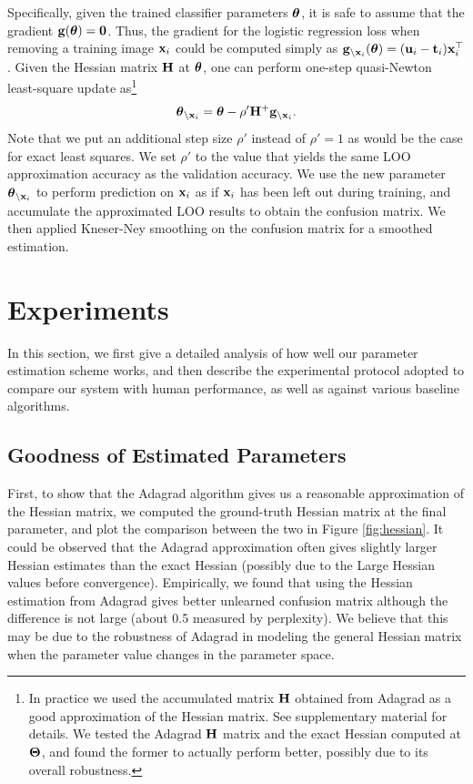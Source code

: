 Specifically, given the trained classifier parameters $\boldsymbol{\theta}$, it is safe to assume that the gradient $\mathbf{g}(\boldsymbol{\theta}) = \mathbf{0}$. Thus, the gradient for the logistic regression loss when removing a training image $\mathbf{x}_i$ could be computed simply as $\mathbf{g}_{\backslash\mathbf{x}_i}(\boldsymbol{\theta}) = (\mathbf{u}_i - \mathbf{t}_i) \mathbf{x}_i^\top$. Given the Hessian matrix $\mathbf{H}$ at $\boldsymbol{\theta}$, one can perform one-step quasi-Newton least-square update as\footnote{In practice we used the accumulated matrix $\mathbf{H}$ obtained from Adagrad \cite{duchi2010adaptive} as a good approximation of the Hessian matrix. See supplementary material for details. We tested the Adagrad $\mathbf{H}$ matrix and the exact Hessian computed at $\boldsymbol{\Theta}$, and found the former to actually perform better, possibly due to its overall robustness.}
\begin{equation}
    \boldsymbol{\theta}_{\backslash\mathbf{x}_i} = \boldsymbol{\theta} - \rho'\mathbf{H}^{+}\mathbf{g}_{\backslash\mathbf{x}_i}.
\end{equation}
Note that we put an additional step size $\rho'$ instead of $\rho'=1$ as would be the case for exact least squares. We set $\rho'$ to the value that yields the same LOO approximation accuracy as the validation accuracy. We use the new parameter $\boldsymbol{\theta}_{\backslash\mathbf{x}_i}$ to perform prediction on $\mathbf{x}_i$ as if $\mathbf{x}_i$ has been left out during training, and accumulate the approximated LOO results to obtain the confusion matrix. We then applied Kneser-Ney \cite{jurafsky2000speech} smoothing on the confusion matrix for a smoothed estimation.

\section{Experiments}
In this section, we first give a detailed analysis of how well our parameter estimation scheme works, and then describe the experimental protocol adopted to compare our system with human performance, as well as against various baseline algorithms.

\subsection{Goodness of Estimated Parameters}
First, to show that the Adagrad algorithm gives us a reasonable approximation of the Hessian matrix, we computed the ground-truth Hessian matrix at the final parameter, and plot the comparison between the two in Figure \ref{fig:hessian}. It could be observed that the Adagrad approximation often gives slightly larger Hessian estimates than the exact Hessian (possibly due to the Large Hessian values before convergence). Empirically, we found that using the Hessian estimation from Adagrad gives better unlearned confusion matrix although the difference is not large (about 0.5 measured by perplexity). We believe that this may be due to the robustness of Adagrad in modeling the general Hessian matrix when the parameter value changes in the parameter space.

